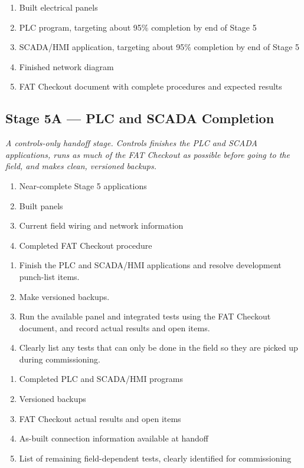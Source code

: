\begin{enumerate}[itemsep=1pt]
  \item Built electrical panels
  \item PLC program, targeting about 95\% completion by end of Stage 5
  \item SCADA/HMI application, targeting about 95\% completion by end of Stage 5
  \item Finished network diagram
  \item FAT Checkout document with complete procedures and expected results
\end{enumerate}

\subsection{Stage 5A --- PLC and SCADA Completion}
\textit{A controls-only handoff stage. Controls finishes the PLC and SCADA applications, runs as much of the FAT Checkout as possible before going to the field, and makes clean, versioned backups.}

\begin{enumerate}[itemsep=1pt]
  \item Near-complete Stage 5 applications
  \item Built panels
  \item Current field wiring and network information
  \item Completed FAT Checkout procedure
\end{enumerate}

\begin{enumerate}[itemsep=1pt]
  \item Finish the PLC and SCADA/HMI applications and resolve development punch-list items.
  \item Make versioned backups.
  \item Run the available panel and integrated tests using the FAT Checkout document, and record actual results and open items.
  \item Clearly list any tests that can only be done in the field so they are picked up during commissioning.
\end{enumerate}

\begin{enumerate}[itemsep=1pt]
  \item Completed PLC and SCADA/HMI programs
  \item Versioned backups
  \item FAT Checkout actual results and open items
  \item As-built connection information available at handoff
  \item List of remaining field-dependent tests, clearly identified for commissioning
\end{enumerate}

